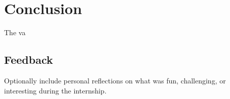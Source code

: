 \section{Conclusion}
The va



\subsection{Feedback}
Optionally include personal reflections on what was fun, challenging, or
interesting during the internship.